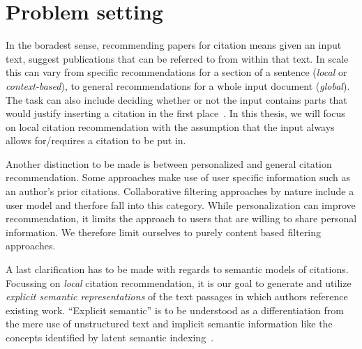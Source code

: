 


\section{Problem setting}\label{sec:problemsetting}
In the boradest sense, recommending papers for citation means given an input text, suggest publications that can be referred to from within that text. In scale this can vary from specific recommendations for a section of a sentence (\emph{local} or \emph{context-based}), to general recommendations for a whole input document (\emph{global}). The task can also include deciding whether or not the input contains parts that would justify inserting a citation in the first place~\cite{He2011}. In this thesis, we will focus on local citation recommendation with the assumption that the input always allows for/requires a citation to be put in.

Another distinction to be made is between personalized and general citation recommendation. Some approaches make use of user specific information such as an author's prior citations. Collaborative filtering approaches by nature include a user model and therfore fall into this category. While personalization can improve recommendation, it limits the approach to users that are willing to share personal information. %
We therefore limit ourselves to purely content based filtering approaches.

A last clarification has to be made with regards to semantic models of citations. Focussing on \emph{local} citation recommendation, it is our goal to generate and utilize \emph{explicit semantic representations} of the text passages in which authors reference existing work. ``Explicit semantic'' is to be understood as a differentiation from the mere use of unstructured text and implicit semantic information like the concepts identified by latent semantic indexing~\cite{Deerwester1990}.

